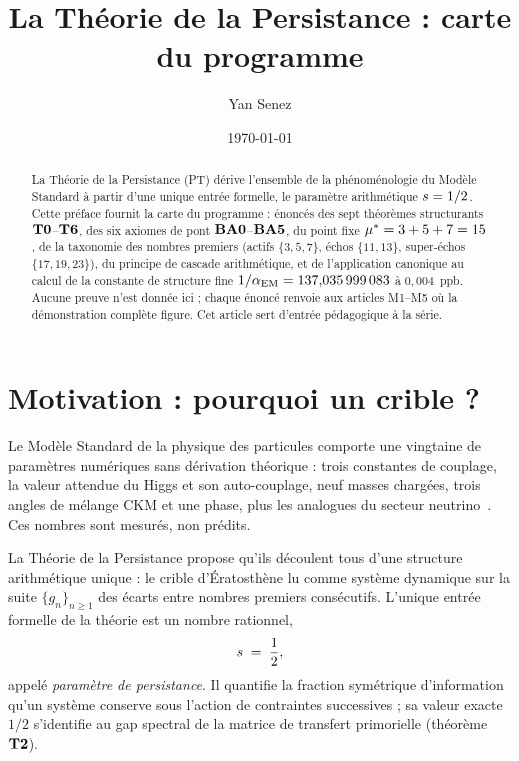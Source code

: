 

\title{La Théorie de la Persistance : carte du programme}
\author{Yan Senez}
\date{\today}



\maketitle

\begin{abstract}
\noindent
La Théorie de la Persistance (PT) dérive l'ensemble de la phénoménologie du Modèle Standard à partir d'une unique entrée formelle, le paramètre arithmétique $s = 1/2$. Cette préface fournit la carte du programme : énoncés des sept théorèmes structurants $\textbf{T0}$--$\textbf{T6}$, des six axiomes de pont $\textbf{BA0}$--$\textbf{BA5}$, du point fixe $\mu^{*} = 3 + 5 + 7 = 15$, de la taxonomie des nombres premiers (actifs $\{3,5,7\}$, échos $\{11,13\}$, super-échos $\{17,19,23\}$), du principe de cascade arithmétique, et de l'application canonique au calcul de la constante de structure fine $1/\alpha_{\rm EM} = 137{,}035\,999\,083$ à $0{,}004$~ppb. Aucune preuve n'est donnée ici ; chaque énoncé renvoie aux articles M1--M5 où la démonstration complète figure. Cet article sert d'entrée pédagogique à la série.
\end{abstract}

\tableofcontents

\section{Motivation : pourquoi un crible ?}
\label{sec:motivation}

Le Modèle Standard de la physique des particules comporte une vingtaine de paramètres numériques sans dérivation théorique : trois constantes de couplage, la valeur attendue du Higgs et son auto-couplage, neuf masses chargées, trois angles de mélange CKM et une phase, plus les analogues du secteur neutrino~\cite{PDG2024}. Ces nombres sont mesurés, non prédits.

La Théorie de la Persistance propose qu'ils découlent tous d'une structure arithmétique unique : le crible d'Ératosthène lu comme système dynamique sur la suite $\{g_n\}_{n \geq 1}$ des écarts entre nombres premiers consécutifs. L'unique entrée formelle de la théorie est un nombre rationnel,
\[
s \;=\; \dfrac{1}{2},
\]
appelé \emph{paramètre de persistance}. Il quantifie la fraction symétrique d'information qu'un système conserve sous l'action de contraintes successives ; sa valeur exacte $1/2$ s'identifie au gap spectral de la matrice de transfert primorielle (théorème $\textbf{T2}$).

